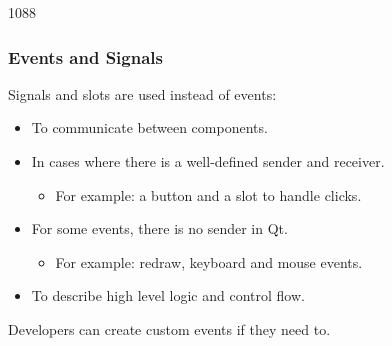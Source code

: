 \begin{slide}{1088}
\frametitle{Events and Signals}
Signals and slots are used instead of events:

\begin{itemize}
\item To communicate between components.
\item In cases where there is a well-defined sender and receiver.
  \begin{itemize}
  \item For example: a button and a slot to handle clicks.
  \end{itemize}
\item For some events, there is no sender in Qt.
  \begin{itemize}
  \item For example: redraw, keyboard and mouse events.
  \end{itemize}
\item To describe high level logic and control flow.
\end{itemize}

Developers can create custom events if they need to.
\end{slide}
